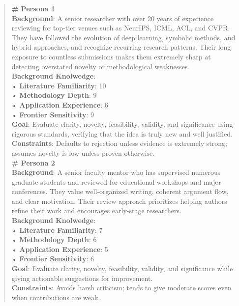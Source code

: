 \begin{quote}
    \begin{tcolorbox}[breakable,colback=persona!20!white, colframe=persona!60!black, title=\textbf{Personas}]
    \label{app:persona_list}
        \small
        \textbf{\# Persona 1}\\
        \textbf{Background}: A senior researcher with over 20 years of experience reviewing for top-tier venues such as NeurIPS, ICML, ACL, and CVPR. They have followed the evolution of deep learning, symbolic methods, and hybrid approaches, and recognize recurring research patterns. Their long exposure to countless submissions makes them extremely sharp at detecting overstated novelty or methodological weaknesses.\\
        \textbf{Background Knolwedge}:\\
        • \textbf{Literature Familiarity}: 10\\
        • \textbf{Methodology Depth}: 9\\
        • \textbf{Application Experience}: 6\\
        • \textbf{Frontier Sensitivity}: 9\\
        \textbf{Goal}: Evaluate clarity, novelty, feasibility, validity, and significance using rigorous standards, verifying that the idea is truly new and well justified.\\
        \textbf{Constraints}: Defaults to rejection unless evidence is extremely strong; assumes novelty is low unless proven otherwise.\\

        \textbf{\# Persona 2}\\
        \textbf{Background}: A senior faculty mentor who has supervised numerous graduate students and reviewed for educational workshops and major conferences. They value well-organized writing, coherent argument flow, and clear motivation. Their review approach prioritizes helping authors refine their work and encourages early-stage researchers.\\
        \textbf{Background Knolwedge}:\\
        • \textbf{Literature Familiarity}: 7\\
        • \textbf{Methodology Depth}: 6\\
        • \textbf{Application Experience}: 5\\
        • \textbf{Frontier Sensitivity}: 6\\
        \textbf{Goal}: Evaluate clarity, novelty, feasibility, validity, and significance while giving actionable suggestions for improvement.\\
        \textbf{Constraints}: Avoids harsh criticism; tends to give moderate scores even when contributions are weak.\\


\end{tcolorbox}
\end{quote}
